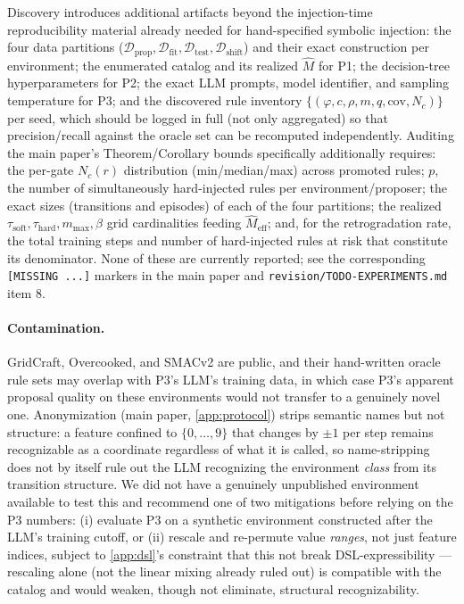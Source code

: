 \documentclass[11pt]{article}
\theoremstyle{plain}
\theoremstyle{definition}
\theoremstyle{remark}
\begin{document}
Discovery introduces additional artifacts beyond the injection-time reproducibility material already needed for hand-specified symbolic injection: the four data partitions ($\mathcal{D}_{\mathrm{prop}},\mathcal{D}_{\mathrm{fit}},\mathcal{D}_{\mathrm{test}},\mathcal{D}_{\mathrm{shift}}$) and their exact construction per environment; the enumerated catalog and its realized $\hat M$ for P1; the decision-tree hyperparameters for P2; the exact LLM prompts, model identifier, and sampling temperature for P3; and the discovered rule inventory $\{(\varphi,c,\rho,m,q,\mathrm{cov},N_c)\}$ per seed, which should be logged in full (not only aggregated) so that precision/recall against the oracle set can be recomputed independently. Auditing the main paper's Theorem/Corollary bounds specifically additionally requires: the per-gate $N_c(r)$ distribution (min/median/max) across promoted rules; $p$, the number of simultaneously hard-injected rules per environment/proposer; the exact sizes (transitions and episodes) of each of the four partitions; the realized $\tau_{\mathrm{soft}},\tau_{\mathrm{hard}},m_{\max},\beta$ grid cardinalities feeding $\hat M_{\mathrm{eff}}$; and, for the retrogradation rate, the total training steps and number of hard-injected rules at risk that constitute its denominator. None of these are currently reported; see the corresponding \texttt{[MISSING ...]} markers in the main paper and \texttt{revision/TODO-EXPERIMENTS.md} item 8.

\paragraph{Contamination.} GridCraft, Overcooked, and SMACv2 are public, and their hand-written oracle rule sets may overlap with P3's LLM's training data, in which case P3's apparent proposal quality on these environments would not transfer to a genuinely novel one. Anonymization (main paper, \autoref{app:protocol}) strips semantic names but not structure: a feature confined to $\{0,\dots,9\}$ that changes by $\pm1$ per step remains recognizable as a coordinate regardless of what it is called, so name-stripping does not by itself rule out the LLM recognizing the environment \emph{class} from its transition structure. We did not have a genuinely unpublished environment available to test this and recommend one of two mitigations before relying on the P3 numbers: (i) evaluate P3 on a synthetic environment constructed after the LLM's training cutoff, or (ii) rescale and re-permute value \emph{ranges}, not just feature indices, subject to \autoref{app:dsl}'s constraint that this not break DSL-expressibility --- rescaling alone (not the linear mixing already ruled out) is compatible with the catalog and would weaken, though not eliminate, structural recognizability.



\end{document}
